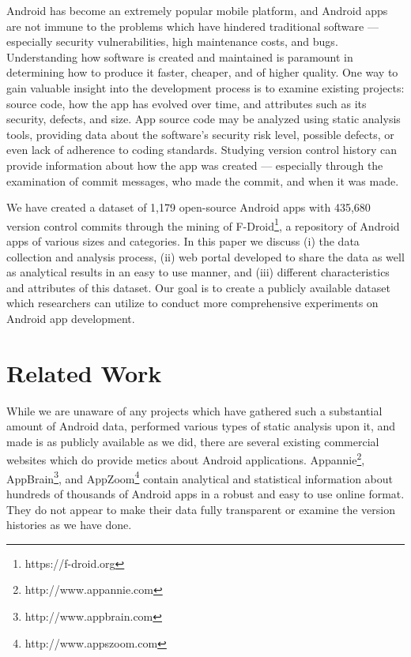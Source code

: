 \documentclass[conference]{IEEEtran}
\begin{document}
Android has become an extremely popular mobile platform, and Android apps are not immune to the problems which have hindered traditional software --- especially security vulnerabilities, high maintenance costs, and bugs. Understanding how software is created and maintained is paramount in determining how to produce it faster, cheaper, and of higher quality. One way to gain valuable insight into the development process is to examine existing projects: source code, how the app has evolved over time, and attributes such as its security, defects, and size. App source code may be analyzed using static analysis tools, providing data about the software's security risk level, possible defects, or even lack of adherence to coding standards. Studying version control history can provide information about how the app was created --- especially through the examination of commit messages, who made the commit, and when it was made.


We have created a dataset of 1,179 open-source Android apps with 435,680 version control commits through the mining of F-Droid\footnote{https://f-droid.org}, a repository of Android apps of various sizes and categories. In this paper we discuss (i) the data collection and analysis process, (ii) web portal developed to share the data as well as analytical results in an easy to use manner, and (iii) different characteristics and attributes of this dataset. Our goal is to create a publicly available dataset which researchers can utilize to conduct more comprehensive experiments on Android app development.

\section{Related Work}
\label{sec: relatedworks}

While we are unaware of any projects which have gathered such a substantial amount of Android data, performed various types of static analysis upon it, and made is as publicly available as we did, there are several existing commercial websites which do provide metics about Android applications. Appannie\footnote{http://www.appannie.com}, AppBrain\footnote{http://www.appbrain.com}, and AppZoom\footnote{http://www.appszoom.com} contain analytical and statistical information about hundreds of thousands of Android apps in a  robust and easy to use online format. They do not appear to make their data fully transparent or examine the version histories as we have done.
\end{document}
